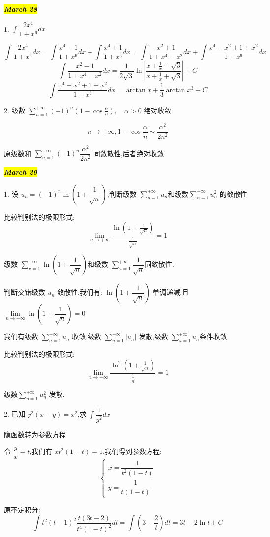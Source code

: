 \hl{\textbf{\textit{March 28}}}

1. $\int\dfrac{2x^4}{1+x^6}dx$
\begin{solution}
	
	$$\int\frac{2x^4}{1+x^6}dx=\int\frac{x^4-1}{1+x^6}dx+\int\frac{x^4+1}{1+x^6}dx=\int\frac{x^2+1}{1+x^4-x^2}dx+\int\frac{x^4-x^2+1+x^2}{1+x^6}dx$$
	$$\int\frac{x^2-1}{1+x^4-x^2}dx=\frac{1}{2\sqrt{3}}\ln|\frac{x+\frac{1}{x}-\sqrt{3}}{x+\frac{1}{x}+\sqrt{3}}|+C$$
	$$\int\frac{x^4-x^2+1+x^2}{1+x^6}dx=\arctan x+\frac{1}{3}\arctan x^3+C$$
\end{solution}

2. 级数 $\sum\limits_{n=1}^{+\infty}(-1)^n(1-\cos \frac{\alpha}{n}),\quad \alpha >0$ 绝对收敛
\begin{solution}
	
	$$n\rightarrow +\infty,1-\cos \frac{\alpha}{n}\sim \frac{\alpha^2}{2n^2}$$
	
	原级数和 $\sum\limits_{n=1}^{+\infty}(-1)^n\dfrac{\alpha^2}{2n^2}$ 同敛散性,后者绝对收敛.
\end{solution}

\hl{\textbf{\textit{March 29}}}

1. 设 $u_{n}=(-1)^{n}\ln(1+\dfrac{1}{\sqrt{n}})$,判断级数 $\sum\limits_{n=1}^{+\infty}u_{n}$和级数$\sum\limits_{n=1}^{+\infty}u^{2}_{n}$ 的敛散性
\begin{solution}
	
	比较判别法的极限形式: 
	$$\lim\limits_{n\rightarrow +\infty}\frac{\ln(1+\frac{1}{\sqrt{n}})}{\frac{1}{\sqrt{n}}}=1$$
	
	级数 $\sum\limits_{n=1}^{+\infty}\ln(1+\dfrac{1}{\sqrt{n}})$和级数 $\sum\limits_{n=1}^{+\infty}\dfrac{1}{\sqrt{n}}$同敛散性.
	
	判断交错级数 $u_{n}$ 敛散性,我们有: $\ln(1+\dfrac{1}{\sqrt{n}})$ 单调递减,且 $\lim\limits_{n\rightarrow+\infty}\ln(1+\dfrac{1}{\sqrt{n}})=0$
	
	我们有级数 $\sum\limits_{n=1}^{+\infty}u_{n}$ 收敛,级数 $\sum\limits_{n=1}^{+\infty}|u_{n}|$ 发散,级数 $\sum\limits_{n=1}^{+\infty}u_{n}$条件收敛.
	
	比较判别法的极限形式: 
	$$\lim\limits_{n\rightarrow +\infty}\frac{\ln^{2}(1+\frac{1}{\sqrt{n}})}{\frac{1}{n}}=1$$
	
	级数$\sum\limits_{n=1}^{+\infty}u^{2}_{n}$ 发散.
\end{solution}

2. 已知 $y^{2}(x-y)=x^2$,求 $\int\dfrac{1}{y^2}dx$ \label{problem: 隐函数转为参数方程}
\begin{solution}
	
	隐函数转为参数方程
	
	令 $\dfrac{y}{x}=t$,我们有 $xt^2(1-t)=1$,我们得到参数方程: 
	$$\left\lbrace\begin{array}{l}
		x=\dfrac{1}{t^2(1-t)}\\y=\dfrac{1}{t(1-t)}
	\end{array} \right. $$
	
	原不定积分:  
	$$ \int t^2(t-1)^2\frac{t(3t-2)}{t^4(1-t)^2}dt=\int(3-\frac{2}{t})dt=3t-2\ln t+C$$
\end{solution}

